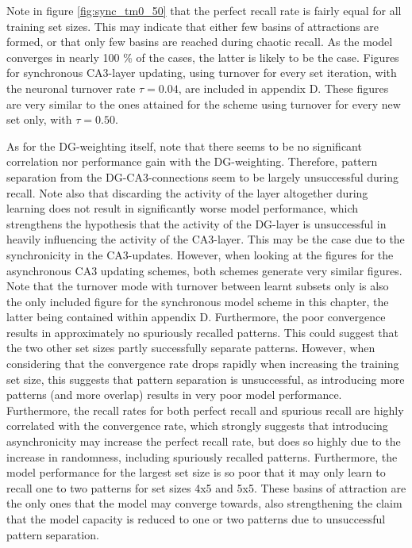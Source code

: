 Note in figure \ref{fig:sync_tm0_50} that the perfect recall rate is fairly equal for all training set sizes. This may indicate that either few basins of attractions are formed, or that only few basins are reached during chaotic recall. As the model converges in nearly 100 \% of the cases, the latter is likely to be the case. Figures for synchronous CA3-layer updating, using turnover for every set iteration, with the neuronal turnover rate $\tau=0.04$, are included in appendix D. These figures are very similar to the ones attained for the scheme using turnover for every new set only, with $\tau=0.50$.

As for the DG-weighting itself, note that there seems to be no significant correlation nor performance gain with the DG-weighting. Therefore, pattern separation from the DG-CA3-connections seem to be largely unsuccessful during recall.
Note also that discarding the activity of the layer altogether during learning does not result in significantly worse model performance, which strengthens the hypothesis that the activity of the DG-layer is unsuccessful in heavily influencing the activity of the CA3-layer. 
This may be the case due to the synchronicity in the CA3-updates. 
However, when looking at the figures for the asynchronous CA3 updating schemes, both schemes generate very similar figures. Note that the turnover mode with turnover between learnt subsets only is also the only included figure for the synchronous model scheme in this chapter, the latter being contained within appendix D.
Furthermore, the poor convergence results in approximately no spuriously recalled patterns. This could suggest that the two other set sizes partly successfully separate patterns. However, when considering that the convergence rate drops rapidly when increasing the training set size, this suggests that pattern separation is unsuccessful, as introducing more patterns (and more overlap) results in very poor model performance. Furthermore, the recall rates for both perfect recall and spurious recall are highly correlated with the convergence rate, which strongly suggests that introducing asynchronicity may increase the perfect recall rate, but does so highly due to the increase in randomness, including spuriously recalled patterns. Furthermore, the model performance for the largest set size is so poor that it may only learn to recall one to two patterns for set sizes 4x5 and 5x5. These basins of attraction are the only ones that the model may converge towards, also strengthening the claim that the model capacity is reduced to one or two patterns due to unsuccessful pattern separation.


